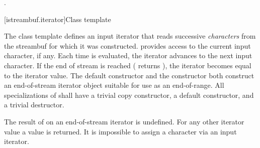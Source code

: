 \begin{itemdescr}
\pnum
\returns
{}.
\end{itemdescr}

[istreambuf.iterator]{Class template }

\pnum
The
class template
defines an input iterator that
reads successive
\textit{characters}
from the streambuf for which it was constructed.
provides access to the current input character, if any.
Each time
is evaluated, the iterator advances to the next input character.
If the end of stream is reached ( returns
),
the iterator becomes equal to the
iterator value.
The default constructor
and the constructor
both construct an end-of-stream iterator object suitable for use
as an end-of-range.
All specializations of  shall have a trivial copy
constructor, a  default constructor, and a trivial destructor.

\pnum
The result of
on an end-of-stream iterator is undefined.
%
For any other iterator value a
value is returned.
It is impossible to assign a character via an input iterator.

